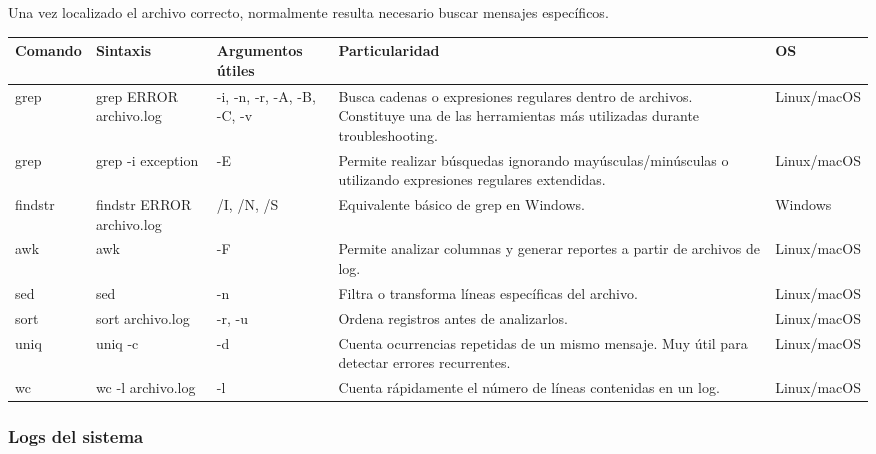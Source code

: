 \documentclass[a4paper,10pt]{article}
\begin{document}
Una vez localizado el archivo correcto, normalmente resulta necesario buscar
mensajes específicos.

\begin{longtable}{|p{2.8cm}|p{3.3cm}|p{4cm}|p{5.3cm}|p{1.5cm}|}

\hline
Comando &
Sintaxis &
Argumentos útiles &
Particularidad &
OS
\\
\hline
\endhead

grep &
grep ERROR archivo.log &
-i, -n, -r, -A, -B, -C, -v &
Busca cadenas o expresiones regulares dentro de archivos. Constituye una de las herramientas más utilizadas durante troubleshooting. &
Linux/macOS
\\
\hline

grep &
grep -i exception &
-E &
Permite realizar búsquedas ignorando mayúsculas/minúsculas o utilizando expresiones regulares extendidas. &
Linux/macOS
\\
\hline

findstr &
findstr ERROR archivo.log &
/I, /N, /S &
Equivalente básico de grep en Windows. &
Windows
\\
\hline

awk &
awk &
-F &
Permite analizar columnas y generar reportes a partir de archivos de log. &
Linux/macOS
\\
\hline

sed &
sed &
-n &
Filtra o transforma líneas específicas del archivo. &
Linux/macOS
\\
\hline

sort &
sort archivo.log &
-r, -u &
Ordena registros antes de analizarlos. &
Linux/macOS
\\
\hline

uniq &
uniq -c &
-d &
Cuenta ocurrencias repetidas de un mismo mensaje. Muy útil para detectar errores recurrentes. &
Linux/macOS
\\
\hline

wc &
wc -l archivo.log &
-l &
Cuenta rápidamente el número de líneas contenidas en un log. &
Linux/macOS
\\
\hline


\end{longtable}


\subsubsection{Logs del sistema}
\end{document}
